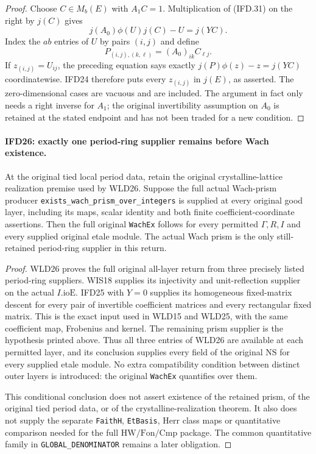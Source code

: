\begin{proof}
Choose $C\in M_b(E)$ with $A_1C=1$. Multiplication of (IFD.31)
on the right by $j(C)$ gives
\[
                   j(A_0)\phi(U)j(C)-U=j(YC).
\]
Index the $ab$ entries of $U$ by pairs $(i,j)$ and define
\[
               P_{(i,j),(k,\ell)}=(A_0)_{ik}C_{\ell j}.
\]
If $z_{(i,j)}=U_{ij}$, the preceding equation says exactly
$j(P)\phi(z)-z=j(YC)$ coordinatewise. IFD24 therefore puts
every $z_{(i,j)}$ in $j(E)$, as asserted.
The zero-dimensional cases are vacuous and are included.
The argument in fact only needs a right inverse for $A_1$;
the original invertibility assumption on $A_0$ is retained at
the stated endpoint and has not been traded for a new condition.
\end{proof}

\paragraph{IFD26: exactly one period-ring supplier remains before Wach existence.}
\label{claim:IFD26}
At the original tied local period data, retain the original
crystalline-lattice realization premise used by WLD26.
Suppose the full actual Wach-prism producer
\texttt{exists\_wach\_prism\_over\_integers} is supplied at every
original good layer, including its maps, scalar identity and both
finite coefficient-coordinate assertions.
Then the full original \texttt{WachEx} follows for every permitted
$\Gamma,R,I$ and every supplied original etale module.
The actual Wach prism is the only still-retained period-ring
supplier in this return.

\begin{proof}
WLD26 proves the full original all-layer return from three precisely
listed period-ring suppliers. WIS18 supplies its injectivity and
unit-reflection supplier on the actual $I.\mathrm{ioE}$.
IFD25 with $Y=0$ supplies its homogeneous fixed-matrix descent
for every pair of invertible coefficient matrices and every
rectangular fixed matrix. This is the exact input used in WLD15
and WLD25, with the same coefficient map, Frobenius and kernel.
The remaining prism supplier is the hypothesis printed above.
Thus all three entries of WLD26 are available at each permitted
layer, and its conclusion supplies every field of the original
$\mathrm{NS}$ for every supplied etale module.
No extra compatibility condition between distinct outer layers
is introduced: the original \texttt{WachEx} quantifies over them.

This conditional conclusion does not assert existence of the
retained prism, of the original tied period data, or of the
crystalline-realization theorem. It also does not supply the
separate \texttt{FaithH}, \texttt{EtBasis}, Herr class maps or
quantitative comparison needed for the full $\mathrm{HW/Fon/Cmp}$
package. The common quantitative family in
\texttt{GLOBAL\_DENOMINATOR} remains a later obligation.
\end{proof}

